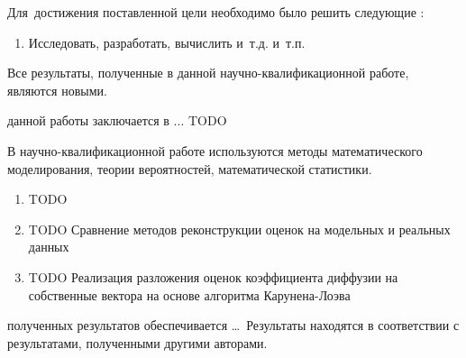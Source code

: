 Для~достижения поставленной цели необходимо было решить следующие {\tasks}:
\begin{enumerate}[beginpenalty=10000] %
  \item Исследовать, разработать, вычислить и~т.\:д. и~т.\:п.
\end{enumerate}


{\novelty}
Все результаты, полученные в данной научно-квалификационной
работе, являются новыми.
	

{\influence} данной работы заключается в ... TODO

{\methods} В научно-квалификационной работе используются методы математического моделирования, теории вероятностей, математической статистики.

{}
\begin{enumerate}[beginpenalty=10000] %
  \item TODO
  \item TODO Сравнение методов реконструкции оценок на модельных и реальных данных
  \item TODO Реализация разложения оценок коэффициента диффузии на собственные вектора на основе алгоритма Карунена-Лоэва
\end{enumerate}

{\reliability} полученных результатов обеспечивается \ldots \ Результаты находятся в соответствии с результатами, полученными другими авторами.


